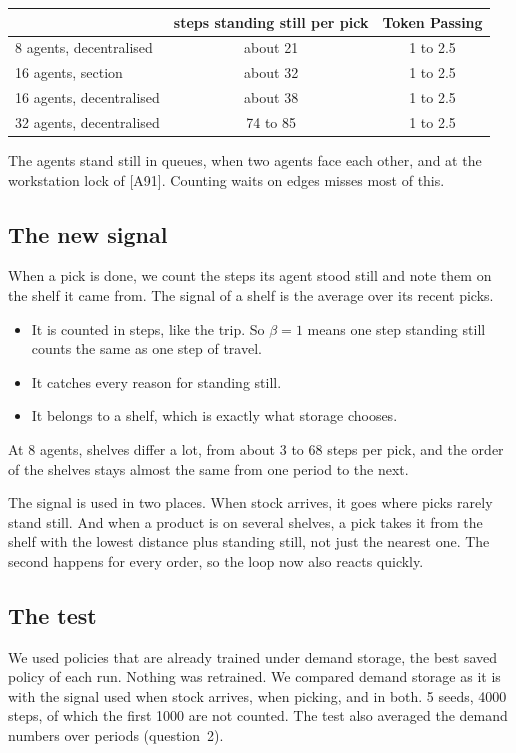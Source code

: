 \documentclass[11pt,a4paper]{article}
\begin{document}
\begin{center}
\begin{tabular}{lcc}
\toprule
 & steps standing still per pick & Token Passing \\
\midrule
8 agents, decentralised & about 21 & 1 to 2.5 \\
16 agents, section & about 32 & 1 to 2.5 \\
16 agents, decentralised & about 38 & 1 to 2.5 \\
32 agents, decentralised & 74 to 85 & 1 to 2.5 \\
\bottomrule
\end{tabular}
\end{center}

The agents stand still in queues, when two agents face each other, and at the
workstation lock of [A91]. Counting waits on edges misses most of this.

\subsection*{The new signal}
When a pick is done, we count the steps its agent stood still and note them on the
shelf it came from. The signal of a shelf is the average over its recent picks.

\begin{itemize}[leftmargin=1.2em]
\item It is counted in steps, like the trip. So $\beta = 1$ means one step standing
  still counts the same as one step of travel.
\item It catches every reason for standing still.
\item It belongs to a shelf, which is exactly what storage chooses.
\end{itemize}

At 8 agents, shelves differ a lot, from about 3 to 68 steps per pick, and the order
of the shelves stays almost the same from one period to the next.

The signal is used in two places. When stock arrives, it goes where picks rarely
stand still. And when a product is on several shelves, a pick takes it from the
shelf with the lowest distance plus standing still, not just the nearest one. The
second happens for every order, so the loop now also reacts quickly.

\subsection*{The test}
We used policies that are already trained under demand storage, the best saved
policy of each run. Nothing was retrained. We compared demand storage as it is with
the signal used when stock arrives, when picking, and in both. 5 seeds, 4000 steps,
of which the first 1000 are not counted. The test also averaged the demand numbers
over periods (question~2).
\end{document}
